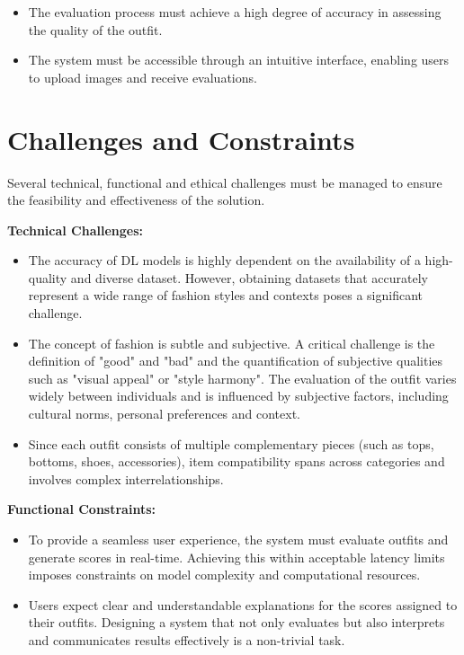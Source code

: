 \begin{itemize}
  \item The evaluation process must achieve a high degree of accuracy in assessing the quality of the outfit.
  \item The system must be accessible through an intuitive interface, enabling users to upload images and receive evaluations.
\end{itemize}

\section{Challenges and Constraints}

Several technical, functional and ethical challenges must be managed to ensure the feasibility and effectiveness of the solution.

\vspace{0.5cm}

\textbf{Technical Challenges:}

\begin{itemize}
  \item The accuracy of \acs{DL} models is highly dependent on the availability of a high-quality and diverse dataset. However, obtaining datasets that accurately represent a wide range of fashion styles and contexts poses a significant challenge.
  \item The concept of fashion is subtle and subjective. A critical challenge is the definition of "good" and "bad" and the quantification of subjective qualities such as "visual appeal" or "style harmony". The evaluation of the outfit varies widely between individuals and is influenced by subjective factors, including cultural norms, personal preferences and context. \cite[cf.]{chen_survey_2023}
  \item Since each outfit consists of multiple complementary pieces (such as tops, bottoms, shoes, accessories), item compatibility spans across categories and involves complex interrelationships. \cite[cf.]{chen_survey_2023}
\end{itemize}

\vspace{0.5cm}

\textbf{Functional Constraints:}

\begin{itemize}
  \item To provide a seamless user experience, the system must evaluate outfits and generate scores in real-time. Achieving this within acceptable latency limits imposes constraints on model complexity and computational resources.
  \item Users expect clear and understandable explanations for the scores assigned to their outfits. Designing a system that not only evaluates but also interprets and communicates results effectively is a non-trivial task.
\end{itemize}

